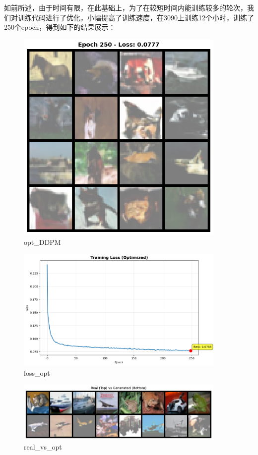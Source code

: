 \documentclass{ctexart}
\begin{document}
\noindent
如前所述，由于时间有限，在此基础上，为了在较短时间内能训练较多的轮次，我们对训练代码进行了优化，小幅提高了训练速度，在3090上训练12个小时，训练了250个epoch，得到如下的结果展示：
\begin{figure}[htb]
    \centering
    \includegraphics[width=0.9\textwidth]{epoch_250_samples_opt.png}
    \caption{opt_DDPM}
    \label{fig:cifar10_grid}
\end{figure}

\begin{figure}[htb]
    \centering
    \includegraphics[width=0.9\textwidth]{loss_curve_epoch_250_opt.png}
    \caption{loss_opt}
    \label{fig:loss_retrain}
\end{figure}

\begin{figure}[htb]
    \centering
    \includegraphics[width=0.9\textwidth]{real_vs_opt.png}
    \caption{real_vs_opt}
    \label{fig:loss_retrain}
\end{figure}
\end{document}
